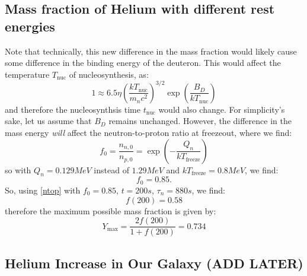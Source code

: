 \subsection{Mass fraction of Helium with different rest energies}
Note that technically, this new difference in the mass fraction would likely cause some difference in the binding energy of the deuteron. This would affect the temperature $T_{\text{nuc}}$ of nucleosynthesis, as:
\begin{equation}
    1 \approx 6.5\eta\left(\frac{kT_{\text{nuc}}}{m_n c^2}\right)^{3/2}\exp(\frac{B_{D}}{kT_{\text{nuc}}})
\end{equation}
and therefore the nucleosynthsis time $t_{\text{nuc}}$ would also change. For simplicity's sake, let us assume that $B_D$ remains unchanged. However, the difference in the mass energy \emph{will} affect the neutron-to-proton ratio at freezeout, where we find:
\begin{equation}
    f_0 = \frac{n_{n, 0}}{n_{p, 0}} = \exp(-\frac{Q_{n}}{kT_{\text{freeze}}})
\end{equation}
so with $Q_{n} = 0.129\si{MeV}$ instead of $1.29\si{MeV}$ and $kT_{\text{freeze}} = 0.8\si{MeV}$, we find:
\begin{equation}
    f_0 = 0.85.
\end{equation}
So, using \eqref{ntop} with $f_0 = 0.85$, $t = 200\si{s}$, $\tau_n = 880\si{s}$, we find:
\begin{equation}
    f(200) = 0.58
\end{equation}
therefore the maximum possible mass fraction is given by:
\begin{equation}
    \boxed{Y_{\text{max}} = \frac{2f(200)}{1 + f(200)} = 0.734}
\end{equation}


\subsection{Helium Increase in Our Galaxy (ADD LATER)}

